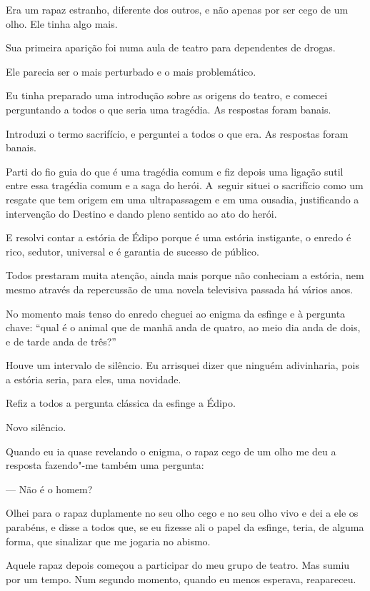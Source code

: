  

Era um rapaz estranho, diferente dos outros, e não apenas por ser cego
de um olho. Ele tinha algo mais.

Sua primeira aparição foi numa aula de teatro para dependentes de
drogas.

Ele parecia ser o mais perturbado e o mais problemático.

Eu tinha preparado uma introdução sobre as origens do teatro, e comecei
perguntando a todos o que seria uma tragédia. As respostas foram banais.

Introduzi o termo sacrifício, e perguntei a todos o que era. As
respostas foram banais.

Parti do fio guia do que é uma tragédia comum e fiz depois uma ligação
sutil entre essa tragédia comum e a saga do herói. A~seguir situei o
sacrifício como um resgate que tem origem em uma ultrapassagem e em uma
ousadia, justificando a intervenção do Destino e dando pleno sentido ao
ato do herói.

E resolvi contar a estória de Édipo porque é uma estória instigante, o
enredo é rico, sedutor, universal e é garantia de sucesso de público.

Todos prestaram muita atenção, ainda mais porque não conheciam a
estória, nem mesmo através da repercussão de uma novela televisiva
passada há vários anos.

No momento mais tenso do enredo cheguei ao enigma da esfinge e à
pergunta chave: ``qual é o animal que de manhã anda de quatro, ao meio
dia anda de dois, e de tarde anda de três?''

Houve um intervalo de silêncio. Eu arrisquei dizer que ninguém
adivinharia, pois a estória seria, para eles, uma novidade.

Refiz a todos a pergunta clássica da esfinge a Édipo.

Novo silêncio.

Quando eu ia quase revelando o enigma, o rapaz cego de um olho me deu a
resposta fazendo"-me também uma pergunta:

— Não é o homem?

Olhei para o rapaz duplamente no seu olho cego e no seu olho vivo e dei
a ele os parabéns, e disse a todos que, se eu fizesse ali o papel da
esfinge, teria, de alguma forma, que sinalizar que me jogaria no abismo.

\asterisc{}

Aquele rapaz depois começou a participar do meu grupo de teatro. Mas
sumiu por um tempo. Num segundo momento, quando eu menos esperava,
reapareceu.

